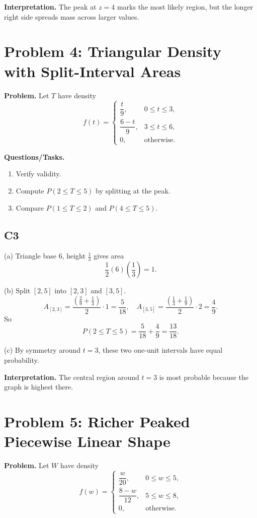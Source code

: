 \textbf{Interpretation.}
The peak at $z=4$ marks the most likely region, but the longer right side spreads mass across larger values.

\section{Problem 4: Triangular Density with Split-Interval Areas}

\textbf{Problem.}
Let $T$ have density
\[
f(t)=\begin{cases}
\dfrac{t}{9}, & 0\le t\le 3,\\
\dfrac{6-t}{9}, & 3\le t\le 6,\\
0, & \text{otherwise.}
\end{cases}
\]

\textbf{Questions/Tasks.}
\begin{enumerate}
\item Verify validity.
\item Compute $P(2\le T\le 5)$ by splitting at the peak.
\item Compare $P(1\le T\le 2)$ and $P(4\le T\le 5)$.
\end{enumerate}

\subsection*{C3}
(a) Triangle base $6$, height $\frac13$ gives area
\[
\frac12(6)\left(\frac13\right)=1.
\]

(b) Split $[2,5]$ into $[2,3]$ and $[3,5]$.
\[
A_{[2,3]}=\frac{\left(\frac29+\frac13\right)}{2}\cdot1=\frac{5}{18},
\quad
A_{[3,5]}=\frac{\left(\frac13+\frac19\right)}{2}\cdot2=\frac{4}{9}.
\]
So
\[
P(2\le T\le 5)=\frac{5}{18}+\frac{4}{9}=\frac{13}{18}.
\]

(c) By symmetry around $t=3$, these two one-unit intervals have equal probability.

\textbf{Interpretation.}
The central region around $t=3$ is most probable because the graph is highest there.

\section{Problem 5: Richer Peaked Piecewise Linear Shape}

\textbf{Problem.}
Let $W$ have density
\[
f(w)=\begin{cases}
\dfrac{w}{20}, & 0\le w\le 5,\\
\dfrac{8-w}{12}, & 5\le w\le 8,\\
0, & \text{otherwise.}
\end{cases}
\]

